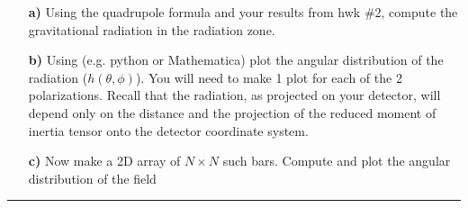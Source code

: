 \documentclass[11pt]{article}
\begin{document}
\begin{enumerate}
\begin{itemize}
\item[\bf a)] Using the quadrupole formula and your results from hwk \#2, compute the gravitational radiation in the radiation zone.

\item[\bf b)] Using (e.g. python or Mathematica) plot the angular distribution of the radiation ($h(\theta, \phi)$). You will need to make 1 plot for each of the 2 polarizations. Recall that the radiation, as projected on your detector, will depend only on the distance and the projection of the reduced moment of inertia tensor onto the detector coordinate system.

\item[\bf c)] Now make a 2D array of $N \times N$ such bars. Compute and plot the angular distribution of the field

\end{itemize}



\end{enumerate}

\bigskip
{\color{Sepia} \hrule}
\end{document}
